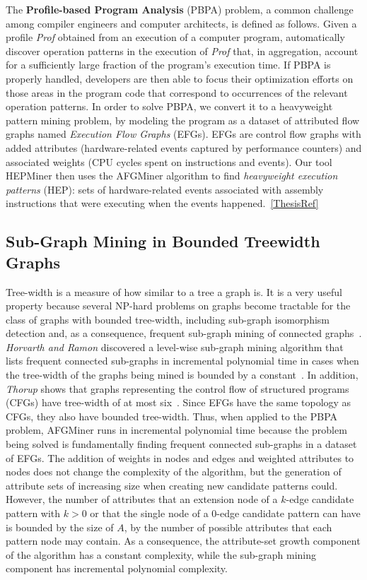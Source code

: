 The  {\bf Profile-based Program Analysis} (PBPA) problem, a common challenge among compiler engineers and computer architects, is defined as follows. Given a profile {\em Prof} obtained from an execution of a computer program, automatically discover operation patterns in the execution of {\em Prof} that, in aggregation, account for a sufficiently large fraction of the program's execution time. If PBPA is properly handled, developers are then able to focus their optimization efforts on those areas in the program code that correspond to occurrences of the relevant operation patterns. In order to solve PBPA, we convert it to a heavyweight pattern mining problem, by modeling the program as a dataset of attributed flow graphs named \emph{Execution Flow Graphs} (EFGs). EFGs are control flow graphs with added attributes (hardware-related events captured by performance counters) and associated weights (CPU cycles spent on instructions and events). Our tool HEPMiner then uses the AFGMiner algorithm to find \emph{heavyweight execution patterns} (HEP): sets of hardware-related events associated with assembly instructions that were executing when the events happened.~\ref{ThesisRef}

\subsection{Sub-Graph Mining in Bounded Treewidth Graphs}

Tree-width is a measure of how similar to a tree a graph is. It is a very useful property because several NP-hard problems on graphs become tractable for the class of graphs with bounded tree-width, including sub-graph isomorphism detection and, as a consequence, frequent sub-graph mining of connected graphs~\cite{Horvath}. \emph{Horvarth and Ramon} discovered a level-wise sub-graph mining algorithm that lists frequent connected sub-graphs in incremental polynomial time in cases when the tree-width of the graphs being mined is bounded by a constant~\cite{Horvath}. In addition, \emph{Thorup} shows that graphs representing the control flow of structured programs (\ie CFGs) have tree-width of at most six~\cite{Thorup}.  Since EFGs have the same topology as CFGs, they also have bounded tree-width. Thus, when applied to the PBPA problem, AFGMiner runs in incremental polynomial time because the problem being solved is fundamentally finding frequent connected sub-graphs in a dataset of EFGs. The addition of weights in nodes and edges and weighted attributes to nodes does not change the complexity of the algorithm, but the generation of attribute sets of increasing size when creating new candidate patterns could. However, the number of attributes that an extension node of a $k$-edge candidate pattern with $k > 0$ or that the single node of a 0-edge candidate pattern can have is bounded by the size of $A$, \ie by the number of possible attributes that each pattern node may contain. As a consequence, the attribute-set growth component of the algorithm has a constant complexity, while the sub-graph mining component has incremental polynomial complexity.


